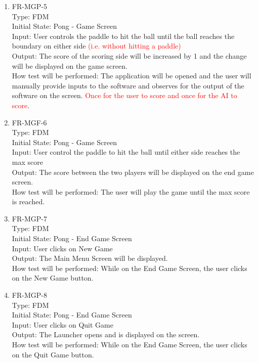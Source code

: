 \documentclass[12pt, titlepage]{article}
\begin{document}
\begin{enumerate}
\item{FR-MGP-5\\}
Type: FDM\\
Initial State: Pong - Game Screen\\
Input: User controls the paddle to hit the ball until the ball reaches the boundary on either side \textcolor{red}{(i.e. without hitting a paddle)}\\
Output: The score of the scoring side will be increased by 1 and the change will be displayed on the game screen.\\
How test will be performed: The application will be opened and the user will manually provide inputs to the software and observes for the output of the software on the screen. \textcolor{red}{Once for the user to score and once for the AI to score}.\\

\item{FR-MGF-6\\}
Type: FDM\\
Initial State: Pong - Game Screen\\
Input: User control the paddle to hit the ball until either side reaches the max score\\
Output: The score between the two players will be displayed on the end game screen.\\
How test will be performed: The user will play the game until the max score is reached.\\

\item{FR-MGP-7\\}
Type: FDM\\
Initial State: Pong - End Game Screen\\
Input: User clicks on New Game\\
Output: The Main Menu Screen will be displayed.\\
How test will be performed: While on the End Game Screen, the user clicks on the New Game button.\\

\item{FR-MGP-8\\}
Type: FDM\\
Initial State: Pong - End Game Screen\\
Input: User clicks on Quit Game\\
Output: The Launcher opens and is displayed on the screen.\\
How test will be performed: While on the End Game Screen, the user clicks on the Quit Game button.\\


\end{enumerate}
\end{document}
